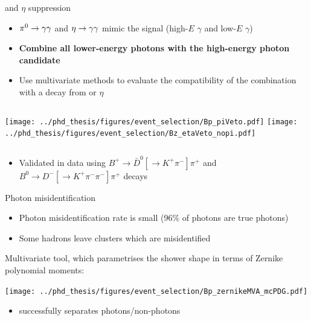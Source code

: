 \documentclass[xcolor=dvipsnames]{beamer}
\begin{document}
\begin{frame}{\piz and $\eta$ suppression}
   \scriptsize\centering
\begin{itemize}
   \item $\pi^0\rightarrow\gamma\gamma$ and $\eta\rightarrow\gamma\gamma$ mimic the signal (high-$E$ $\gamma$ and low-$E$ $\gamma$)
   \item \textbf{Combine all lower-energy photons with the high-energy photon candidate}
   \item Use multivariate methods to evaluate the compatibility of the combination with a decay from \piz or $\eta$
\end{itemize}
\begin{columns}
   \texttt{[image: ../phd\_thesis/figures/event\_selection/Bp\_piVeto.pdf]}
   \texttt{[image: ../phd\_thesis/figures/event\_selection/Bz\_etaVeto\_nopi.pdf]}
\end{columns}
\begin{itemize}
   \item[\ra] Validated in data using $B^+\to \bar{D}^0[\to K^+\pi^-]\pi^+$ and $B^0\to D^-[\to K^+\pi^-\pi^-]\pi^+$ decays
\end{itemize}
\end{frame}

\begin{frame}{Photon misidentification}
\centering   \scriptsize


\begin{itemize}
   \item Photon misidentification rate is small (96\% of photons are true photons)
   \item Some hadrons leave clusters which are misidentified
\end{itemize}

\vspace{5pt}

Multivariate tool, which parametrises the shower shape in terms of Zernike polynomial moments:

\vspace{5pt}

\texttt{[image: ../phd\_thesis/figures/event\_selection/Bp\_zernikeMVA\_mcPDG.pdf]}

\begin{itemize}
   \item[\ra] successfully separates photons/non-photons
\end{itemize}

\end{frame}
\end{document}
